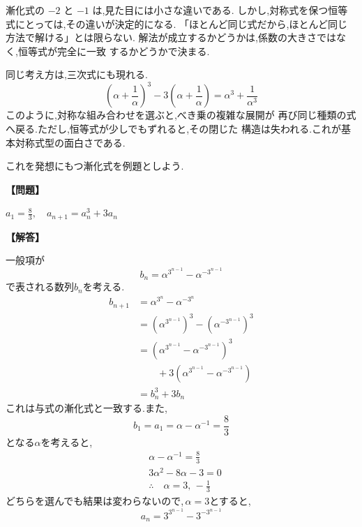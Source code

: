 漸化式の $-2$ と $-1$ は,見た目には小さな違いである.
しかし,対称式を保つ恒等式にとっては,その違いが決定的になる.
「ほとんど同じ式だから,ほとんど同じ方法で解ける」とは限らない.
解法が成立するかどうかは,係数の大きさではなく,恒等式が完全に一致
するかどうかで決まる.

同じ考え方は,三次式にも現れる.
\[
  \left(\alpha+\frac{1}{\alpha}\right)^3
  -3\left(\alpha+\frac{1}{\alpha}\right)
  =\alpha^3+\frac{1}{\alpha^3}
\]
このように,対称な組み合わせを選ぶと,べき乗の複雑な展開が
再び同じ種類の式へ戻る.ただし,恒等式が少しでもずれると,その閉じた
構造は失われる.これが基本対称式型の面白さである.

これを発想にもつ漸化式を例題としよう.

\noindent\textbf{【問題】}
\begin{smallquote}
  $\displaystyle a_1=\frac{8}{3},\quad a_{n+1}=a_n^3+3a_n$
\end{smallquote}
\textbf{【解答】}
\begin{smallquote}
  一般項が
    \[
      b_n=\alpha^{3^{n-1}}-\alpha^{-3^{n-1}}
    \]
    で表される数列$b_n$を考える.
    \begin{align*}
      b_{n+1}&=\alpha^{3^{n}}-\alpha^{-3^{n}}\\
      &=\left(\alpha^{3^{n-1}}\right)^3-\left(\alpha^{-3^{n-1}}\right)^3\\
      &=\left(\alpha^{3^{n-1}}-\alpha^{-3^{n-1}}\right)^3\\
      &\qquad +3\left(\alpha^{3^{n-1}}-\alpha^{-3^{n-1}}\right)\\
      &=b_n^3+3b_n
    \end{align*}
    これは与式の漸化式と一致する.また,
    \[
      b_1=a_1=\alpha-\alpha^{-1}=\frac{8}{3}
    \]
    となる$\alpha$を考えると,
    \begin{align*}
      &\alpha-\alpha^{-1}=\frac{8}{3}\\
      &3\alpha^2-8\alpha-3=0\\
      &\therefore \quad \alpha=3,\,-\frac13
    \end{align*}
    どちらを選んでも結果は変わらないので,\,$\alpha=3$とすると,
    \[
      a_n=3^{3^{n-1}}-3^{-3^{n-1}}
    \]
\end{smallquote}
